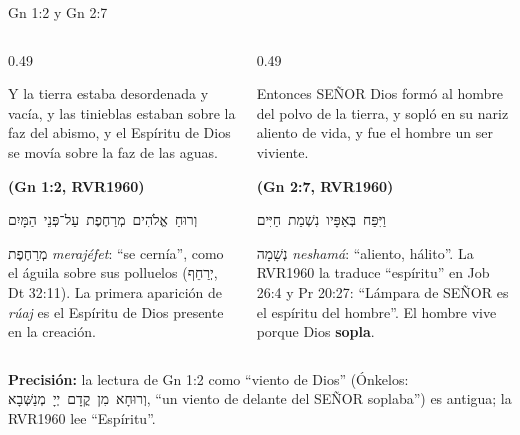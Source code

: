 \documentclass[hyperref={bookmarks=false},aspectratio=169]{beamer}
\newcommand{\heb}[1]{\mbox{\foreignlanguage{hebrew}{#1}}}
\newcommand{\SENOR}{S{\fontsize{0.78em}{1em}\selectfont EÑOR}}
\newcommand{\fuente}[1]{\par\hfill{\upshape\bfseries\footnotesize\textcolor{azul}{#1}}}
\newcommand{\destacar}[1]{\textbf{\textcolor{azul}{#1}}}
\newcommand{\precision}[1]{{\footnotesize\color{gris}\textbf{Precisión:} #1}}
\begin{document}
\begin{frame}{Gn 1:2 y Gn 2:7}
\begin{columns}[t,onlytextwidth]
\begin{column}{0.49\textwidth}
\begin{cita}Y la tierra estaba desordenada y vacía, y las tinieblas estaban sobre la faz del abismo, y el Espíritu de Dios se movía sobre la faz de las aguas.\fuente{(Gn 1:2, RVR1960)}\end{cita}
\begin{center}\heb{וְרוּחַ אֱלֹהִים מְרַחֶפֶת עַל־פְּנֵי הַמָּיִם}\end{center}
\scriptsize \heb{מְרַחֶפֶת} \emph{merajéfet}: ``se cernía'', como el águila sobre sus polluelos (\heb{יְרַחֵף}, Dt 32:11). La primera aparición de \emph{rúaj} es el Espíritu de Dios presente en la creación.
\end{column}
\begin{column}{0.49\textwidth}
\begin{cita}Entonces \SENOR{} Dios formó al hombre del polvo de la tierra, y sopló en su nariz aliento de vida, y fue el hombre un ser viviente.\fuente{(Gn 2:7, RVR1960)}\end{cita}
\begin{center}\heb{וַיִּפַּח בְּאַפָּיו נִשְׁמַת חַיִּים}\end{center}
\scriptsize \heb{נְשָׁמָה} \emph{neshamá}: ``aliento, hálito''. La RVR1960 la traduce ``espíritu'' en Job 26:4 y Pr 20:27: ``Lámpara de \SENOR{} es el espíritu del hombre''. El hombre vive porque Dios \destacar{sopla}.
\end{column}
\end{columns}\par\smallskip
\precision{la lectura de Gn 1:2 como ``viento de Dios'' (Ónkelos: \heb{וְרוּחָא מִן קֳדָם יְיָ מְנַשְּׁבָא}, ``un viento de delante del \SENOR{} soplaba'') es antigua; la RVR1960 lee ``Espíritu''.}
\end{frame}
\end{document}
